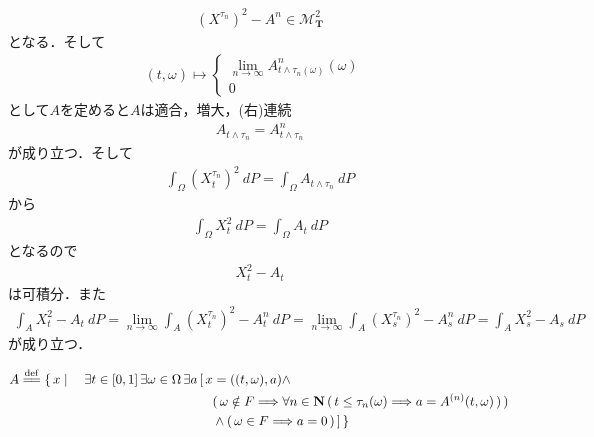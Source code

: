 \begin{sketch}
\begin{description}
				\begin{align}
					\left(X^{\tau_n}\right)^2 - A^n \in \mathscr{M}^2_{\mathbf{T}}
				\end{align}
				となる．そして
				\begin{align}
					(t,\omega) \longmapsto
					\begin{cases}
						\lim_{n \to \infty} A^n_{t \wedge \tau_n(\omega)}(\omega) & \\
						0
					\end{cases}
				\end{align}
				として$A$を定めると$A$は適合，増大，(右)連続
				\begin{align}
					A_{t \wedge \tau_n} = A^n_{t \wedge \tau_n}
				\end{align}
				が成り立つ．そして
				\begin{align}
					\int_\Omega \left(X^{\tau_n}_t\right)^2\ dP = \int_\Omega A_{t \wedge \tau_n}\ dP
				\end{align}
				から
				\begin{align}
					\int_\Omega X_t^2\ dP = \int_\Omega A_t\ dP
				\end{align}
				となるので
				\begin{align}
					X_t^2 - A_t
				\end{align}
				は可積分．また
				\begin{align}
					\int_A X_t^2 - A_t\ dP
					= \lim_{n \to \infty} \int_A \left(X^{\tau_n}_t\right)^2 - A^n_t\ dP
					= \lim_{n \to \infty} \int_A \left(X^{\tau_n}_s\right)^2 - A^n_s\ dP
					= \int_A X_s^2 - A_s\ dP
				\end{align}
				が成り立つ．
				
			
				\begin{align}
					A \defeq \{\, x \mid \quad 
					\exists t \in [0,1]\, \exists \omega \in \Omega\, \exists a\,
					&[\, x = ((t,\omega),a) \wedge \\
					&\quad (\, \omega \notin F \Longrightarrow \forall n \in \Natural\, 
					(\, t \leq \tau_{n}(\omega) \Longrightarrow a = A^{(n)}(t,\omega)\, )\, )\, \\
					&\quad \wedge (\, \omega \in F \Longrightarrow a = 0\, )\, ]\, \}
				\end{align}
			

\end{description}
\end{sketch}
